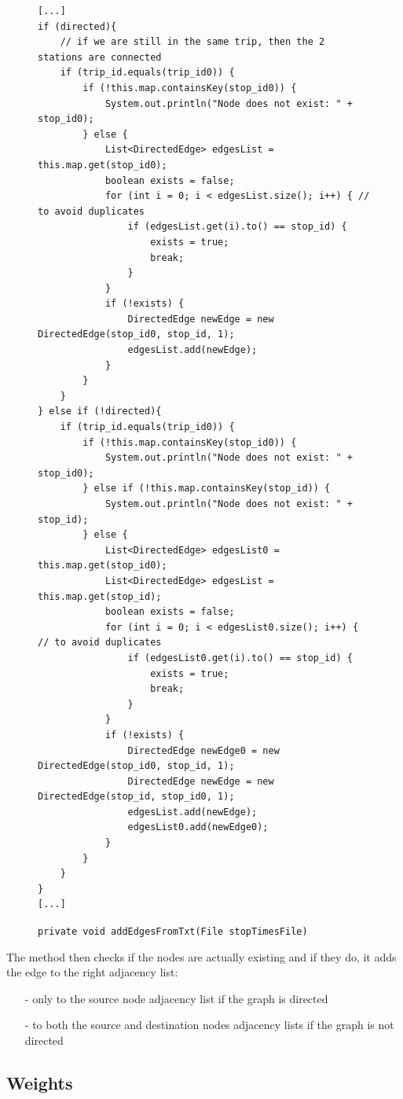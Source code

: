 \documentclass{article}
\begin{document}
\begin{figure}[H]
\begin{verbatim}
[...]
if (directed){
	// if we are still in the same trip, then the 2 stations are connected
	if (trip_id.equals(trip_id0)) { 
		if (!this.map.containsKey(stop_id0)) {
			System.out.println("Node does not exist: " + stop_id0);
		} else {
			List<DirectedEdge> edgesList = this.map.get(stop_id0);
			boolean exists = false;
			for (int i = 0; i < edgesList.size(); i++) { // to avoid duplicates
				if (edgesList.get(i).to() == stop_id) {
					exists = true;
					break;
				}
			}
			if (!exists) {
				DirectedEdge newEdge = new DirectedEdge(stop_id0, stop_id, 1);
				edgesList.add(newEdge);
			}
		}
	}
} else if (!directed){
	if (trip_id.equals(trip_id0)) { 
		if (!this.map.containsKey(stop_id0)) {
			System.out.println("Node does not exist: " + stop_id0);
		} else if (!this.map.containsKey(stop_id)) {
			System.out.println("Node does not exist: " + stop_id);
		} else {	
			List<DirectedEdge> edgesList0 = this.map.get(stop_id0);
			List<DirectedEdge> edgesList = this.map.get(stop_id);
			boolean exists = false;
			for (int i = 0; i < edgesList0.size(); i++) { // to avoid duplicates
				if (edgesList0.get(i).to() == stop_id) {
					exists = true;
					break;
				}
			}
			if (!exists) {
				DirectedEdge newEdge0 = new DirectedEdge(stop_id0, stop_id, 1);
				DirectedEdge newEdge = new DirectedEdge(stop_id, stop_id0, 1);
				edgesList.add(newEdge);
				edgesList0.add(newEdge0);
			}
		}
	}
}
[...]
\end{verbatim}
\vspace*{-10mm}\caption{\texttt{private void addEdgesFromTxt(File stopTimesFile)}}
\end{figure}

The method then checks if the nodes are actually existing and if they do, it adds the edge to the right adjacency list:

\begin{itemize}
\itemsep0em 
\item[-] only to the source node adjacency list if the graph is directed
\item[-] to both the source and destination nodes adjacency lists if the graph is not directed
\end{itemize}

\newpage

\subsection{Weights}
\end{document}
